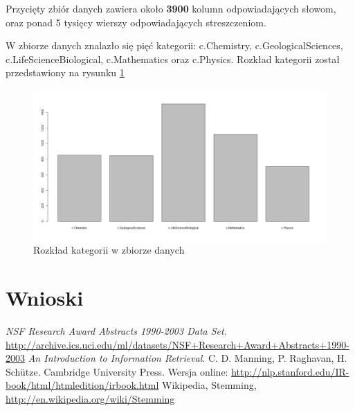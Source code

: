 \documentclass[a4paper,12pt]{article}
\begin{document}
		 Przycięty zbiór danych zawiera około \textbf{3900} kolumn odpowiadających
		 słowom,
		 oraz ponad 5 tysięcy wierszy odpowiadających streszczeniom.
		 
		 W zbiorze danych znalazło się pięć kategorii: c.Chemistry, 		 
		 c.GeologicalSciences, c.LifeScienceBiological, c.Mathematics
		 oraz c.Physics. Rozkład kategorii został przedstawiony na 
		 rysunku \ref{fig:v3hist}
		 \begin{figure}[!h]
		 	\centering
		 		\includegraphics[width=\textwidth]{./img/v3_cats}
		 	\caption{Rozkład kategorii w zbiorze danych}
		 	\label{fig:v3hist}
		 \end{figure}
\section{Wnioski}


\begin{thebibliography}{9}

   \emph{NSF Research Award Abstracts 1990-2003 Data Set}.
   \url{http://archive.ics.uci.edu/ml/datasets/NSF+Research+Award+Abstracts+1990-2003}
	\emph{An Introduction to Information Retrieval}. 
	C. D. Manning, P. Raghavan, H. Sch\"utze.
	Cambridge University Press.
	Wersja online: \url{http://nlp.stanford.edu/IR-book/html/htmledition/irbook.html}
	Wikipedia, Stemming, \url{http://en.wikipedia.org/wiki/Stemming}

\end{thebibliography}
\end{document}
